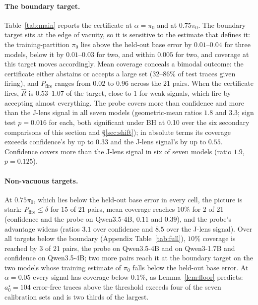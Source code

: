 \documentclass[twoside]{article}
\theoremstyle{remark}
\newcommand{\pizero}{\pi_0}
\newcommand{\pfire}{P_{\mathrm{fire}}}
\begin{document}
\paragraph{The boundary target.} Table~\ref{tab:main} reports the certificate at $\alpha=\pizero$ and at $0.75\pizero$. The boundary target sits at the edge of vacuity, so it is sensitive to the estimate that defines it: the training-partition $\pizero$ lies above the held-out base error by $0.01$--$0.04$ for three models, below it by $0.01$--$0.03$ for two, and within $0.005$ for two, and coverage at this target moves accordingly. Mean coverage conceals a bimodal outcome: the certificate either abstains or accepts a large set (32--86\% of test traces given firing), and $\pfire$ ranges from $0.02$ to $0.96$ across the 21 pairs. When the certificate fires, $\hat R$ is $0.53$--$1.07$ of the target, close to $1$ for weak signals, which fire by accepting almost everything. The probe covers more than confidence and more than the J-lens signal in all seven models (geometric-mean ratios $1.8$ and $3.3$; sign test $p=0.016$ for each, both significant under BH at 0.10 over the six secondary comparisons of this section and \S\ref{sec:shift}); in absolute terms its coverage exceeds confidence's by up to $0.33$ and the J-lens signal's by up to $0.55$. Confidence covers more than the J-lens signal in six of seven models (ratio $1.9$, $p=0.125$).

\paragraph{Non-vacuous targets.} At $0.75\pizero$, which lies below the held-out base error in every cell, the picture is stark: $\pfire\le\delta$ for 15 of 21 pairs, mean coverage reaches $10\%$ for 2 of 21 (confidence and the probe on Qwen3.5-4B, $0.11$ and $0.39$), and the probe's advantage widens (ratios $3.1$ over confidence and $8.5$ over the J-lens signal). Over all targets below the boundary (Appendix Table~\ref{tab:full}), $10\%$ coverage is reached by 3 of 21 pairs, the probe on Qwen3.5-4B and on Qwen3-1.7B and confidence on Qwen3.5-4B; two more pairs reach it at the boundary target on the two models whose training estimate of $\pizero$ falls below the held-out base error. At $\alpha=0.05$ every signal has coverage below $0.1\%$, as Lemma~\ref{lem:floor} predicts: $a_0^\star=104$ error-free traces above the threshold exceeds four of the seven calibration sets and is two thirds of the largest.
\end{document}
